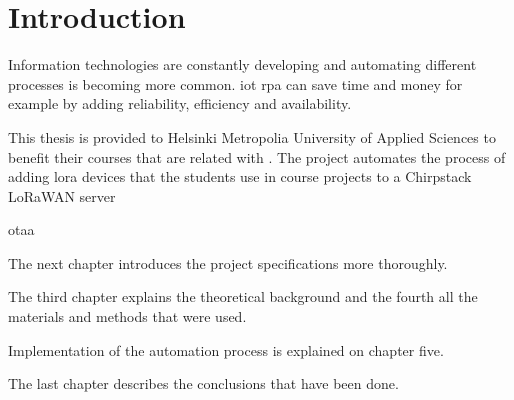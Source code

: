
\chapter{Introduction}

Information technologies are constantly developing and automating different processes is becoming more common. \gls{iot} \gls{rpa} can save time and money for example by adding reliability, efficiency and availability.

This thesis is provided to Helsinki Metropolia University of Applied Sciences to benefit their courses that are related with . The project automates the process of adding \gls{lora} devices that the students use in course projects to a Chirpstack LoRaWAN server

\gls{otaa}




The next chapter introduces the project specifications more thoroughly.

The third chapter explains the theoretical background and the fourth all the materials and methods that were used. 

Implementation of the automation process is explained on chapter five.

The last chapter describes the conclusions that have been done.


\clearpage %
